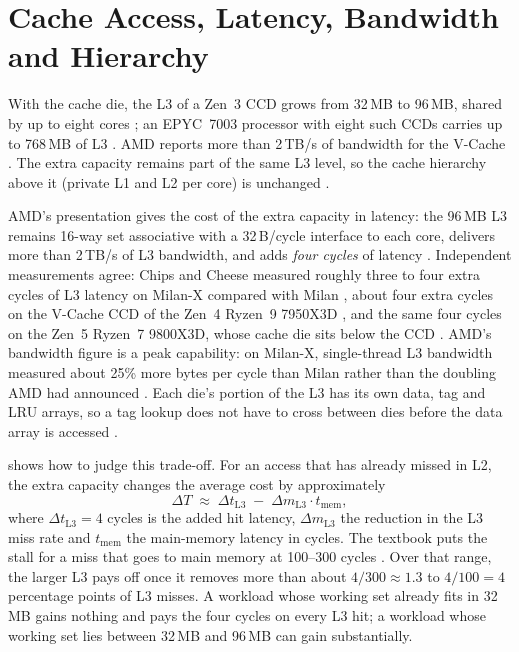 \section{Cache Access, Latency, Bandwidth and Hierarchy}
\label{sec:vcache-access}

With the cache die, the L3 of a Zen~3 CCD grows from 32\,MB to 96\,MB, shared by up to eight cores \cite{wuu2022vcache,amd2022epyc7003}; an EPYC~7003 processor with eight such CCDs carries up to 768\,MB of L3 \cite{amd2022epyc7003}. AMD reports more than 2\,TB/s of bandwidth for the V-Cache \cite{wuu2022vcache}. The extra capacity remains part of the same L3 level, so the cache hierarchy above it (private L1 and L2 per core) is unchanged \cite{amd2022epyc7003}.

AMD's presentation gives the cost of the extra capacity in latency: the 96\,MB L3 remains 16-way set associative with a 32\,B/cycle interface to each core, delivers more than 2\,TB/s of L3 bandwidth, and adds \emph{four cycles} of latency \cite[slide~20]{wuu2022vcache}. Independent measurements agree: Chips and Cheese measured roughly three to four extra cycles of L3 latency on Milan-X compared with Milan \cite{cozmaDeepDivingZen2022}, about four extra cycles on the V-Cache CCD of the Zen~4 Ryzen~9 7950X3D \cite{lamAMDs7950X3DZen2023}, and the same four cycles on the Zen~5 Ryzen~7 9800X3D, whose cache die sits below the CCD \cite{cozmaAMDs9800X3D2nd2024}. AMD's bandwidth figure is a peak capability: on Milan-X, single-thread L3 bandwidth measured about 25\% more bytes per cycle than Milan rather than the doubling AMD had announced \cite{cozmaDeepDivingZen2022}. Each die's portion of the L3 has its own data, tag and LRU arrays, so a tag lookup does not have to cross between dies before the data array is accessed \cite[slide~20]{wuu2022vcache}.

 shows how to judge this trade-off. For an access that has already missed in L2, the extra capacity changes the average cost by approximately
\begin{equation}
  \Delta T \;\approx\; \Delta t_{\mathrm{L3}} \;-\; \Delta m_{\mathrm{L3}} \cdot t_{\mathrm{mem}},
  \label{eq:vcache-tradeoff}
\end{equation}
where $\Delta t_{\mathrm{L3}} = 4$ cycles is the added hit latency, $\Delta m_{\mathrm{L3}}$ the reduction in the L3 miss rate and $t_{\mathrm{mem}}$ the main-memory latency in cycles. The textbook puts the stall for a miss that goes to main memory at 100--300 cycles \cite[sec.~12.4.8]{sarangi2025basic}. Over that range, the larger L3 pays off once it removes more than about $4/300 \approx 1.3$ to $4/100 = 4$ percentage points of L3 misses. A workload whose working set already fits in 32\,MB gains nothing and pays the four cycles on every L3 hit; a workload whose working set lies between 32\,MB and 96\,MB can gain substantially.


